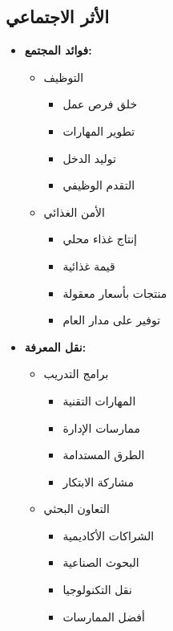\subsection{الأثر الاجتماعي}
\begin{itemize}
    \item \textbf{فوائد المجتمع:}
    \begin{itemize}
        \item التوظيف
        \begin{itemize}
            \item خلق فرص عمل
            \item تطوير المهارات
            \item توليد الدخل
            \item التقدم الوظيفي
        \end{itemize}
        
        \item الأمن الغذائي
        \begin{itemize}
            \item إنتاج غذاء محلي
            \item قيمة غذائية
            \item منتجات بأسعار معقولة
            \item توفير على مدار العام
        \end{itemize}
    \end{itemize}
    
    \item \textbf{نقل المعرفة:}
    \begin{itemize}
        \item برامج التدريب
        \begin{itemize}
            \item المهارات التقنية
            \item ممارسات الإدارة
            \item الطرق المستدامة
            \item مشاركة الابتكار
        \end{itemize}
        
        \item التعاون البحثي
        \begin{itemize}
            \item الشراكات الأكاديمية
            \item البحوث الصناعية
            \item نقل التكنولوجيا
            \item أفضل الممارسات
        \end{itemize}
    \end{itemize}
\end{itemize}

